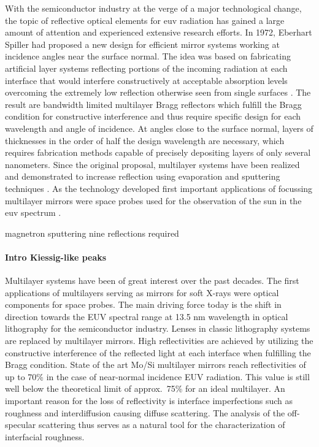 With the semiconductor industry at the verge of a major technological change, the topic of reflective optical elements for \gls{euv} radiation has gained a large amount of attention and experienced extensive research efforts. In 1972, Eberhart Spiller had proposed a new design for efficient mirror systems working at incidence angles near the surface normal. The idea was based on fabricating artificial layer systems reflecting portions of the incoming radiation at each interface that would interfere constructively at acceptable absorption levels overcoming the extremely low reflection otherwise seen from single surfaces \cite{spiller_low-loss_1972}. The result are bandwidth limited multilayer Bragg reflectors which fulfill the Bragg condition for constructive interference and thus require specific design for each wavelength and angle of incidence. At angles close to the surface normal, layers of thicknesses in the order of half the design wavelength are necessary, which requires fabrication methods capable of precisely depositing layers of only several nanometers. Since the original proposal, multilayer systems have been realized and demonstrated to increase reflection using evaporation and sputtering techniques \cite{spiller_reflective_1976, underwood_layered_1981}. As the technology developed first important applications of focussing multilayer mirrors were space probes used for the observation of the sun in the \gls{euv} spectrum \cite{chauvineau_description_1992, clette_eit:_1995, spiller_soft_1994}.

magnetron sputtering \cite{stearns_fabrication_1991}
nine reflections required \cite{kaiser_euvl_2008}

\paragraph{Intro Kiessig-like peaks}
Multilayer systems have been of great interest over the past decades. The first applications of multilayers serving as mirrors for soft X-rays were optical components for space probes. The main driving force today is the shift in direction towards the EUV spectral range at 13.5 nm wavelength in optical lithography for the semiconductor industry. Lenses in classic lithography systems are replaced by multilayer mirrors. High  reflectivities are achieved by utilizing the constructive interference of the reflected light at each interface when fulfilling the Bragg condition. State of the art Mo/Si multilayer mirrors reach reflectivities of up to 70\% \cite{braun_mo/si_2002, feigl_euv_2006} in the case of near-normal incidence EUV radiation. This value is still well below the theoretical limit of approx.~75\% for an ideal multilayer. An important reason for the loss of reflectivity is interface imperfections such as roughness and interdiffusion causing diffuse scattering. The analysis of the off-
specular scattering 
thus serves as a 
natural tool for the characterization of interfacial roughness. 

